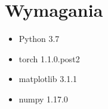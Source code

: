 \section{Wymagania}
\begin{itemize}
    \item Python 3.7
	\item torch 1.1.0.post2
    \item matplotlib 3.1.1
    \item numpy 1.17.0
 \end{itemize}